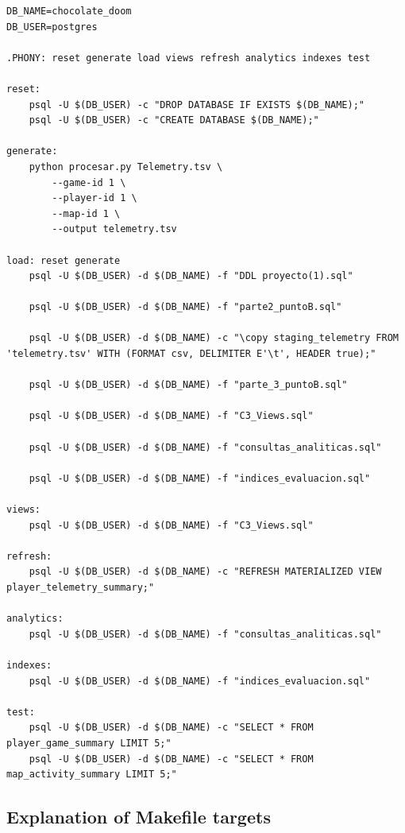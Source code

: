 \documentclass[11pt]{article}
\begin{document}
\begin{lstlisting}
DB_NAME=chocolate_doom
DB_USER=postgres

.PHONY: reset generate load views refresh analytics indexes test

reset:
	psql -U $(DB_USER) -c "DROP DATABASE IF EXISTS $(DB_NAME);"
	psql -U $(DB_USER) -c "CREATE DATABASE $(DB_NAME);"

generate:
	python procesar.py Telemetry.tsv \
		--game-id 1 \
		--player-id 1 \
		--map-id 1 \
		--output telemetry.tsv

load: reset generate
	psql -U $(DB_USER) -d $(DB_NAME) -f "DDL proyecto(1).sql"

	psql -U $(DB_USER) -d $(DB_NAME) -f "parte2_puntoB.sql"

	psql -U $(DB_USER) -d $(DB_NAME) -c "\copy staging_telemetry FROM 'telemetry.tsv' WITH (FORMAT csv, DELIMITER E'\t', HEADER true);"

	psql -U $(DB_USER) -d $(DB_NAME) -f "parte_3_puntoB.sql"

	psql -U $(DB_USER) -d $(DB_NAME) -f "C3_Views.sql"

	psql -U $(DB_USER) -d $(DB_NAME) -f "consultas_analiticas.sql"

	psql -U $(DB_USER) -d $(DB_NAME) -f "indices_evaluacion.sql"

views:
	psql -U $(DB_USER) -d $(DB_NAME) -f "C3_Views.sql"

refresh:
	psql -U $(DB_USER) -d $(DB_NAME) -c "REFRESH MATERIALIZED VIEW player_telemetry_summary;"

analytics:
	psql -U $(DB_USER) -d $(DB_NAME) -f "consultas_analiticas.sql"

indexes:
	psql -U $(DB_USER) -d $(DB_NAME) -f "indices_evaluacion.sql"

test:
	psql -U $(DB_USER) -d $(DB_NAME) -c "SELECT * FROM player_game_summary LIMIT 5;"
	psql -U $(DB_USER) -d $(DB_NAME) -c "SELECT * FROM map_activity_summary LIMIT 5;"
\end{lstlisting}

\subsection{Explanation of Makefile targets}
\end{document}
